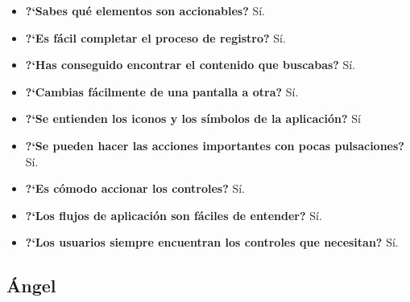\begin{itemize}
    \item \textbf{?`Sabes qué elementos son accionables?} Sí. 
    \item \textbf{?`Es fácil completar el proceso de registro?} Sí. 
    \item \textbf{?`Has conseguido encontrar el contenido que buscabas?} Sí.
    \item \textbf{?`Cambias fácilmente de una pantalla a otra?} Sí.
    \item \textbf{?`Se entienden los iconos y los símbolos de la aplicación?} Sí
    \item \textbf{?`Se pueden hacer las acciones importantes con pocas pulsaciones?} Sí.
    \item \textbf{?`Es cómodo accionar los controles?} Sí.
    \item \textbf{?`Los flujos de aplicación son fáciles de entender?} Sí.
    \item \textbf{?`Los usuarios siempre encuentran los controles que necesitan?} Sí.
\end{itemize}

\subsection{Ángel}

